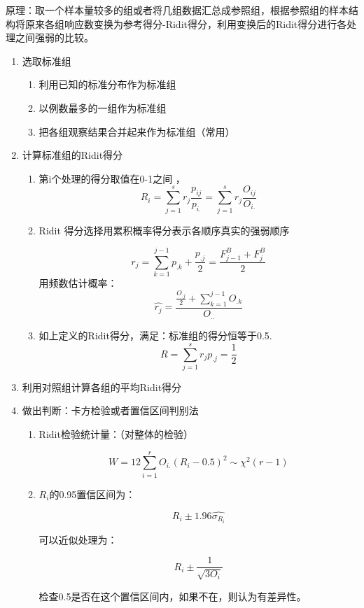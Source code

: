 \documentclass[
]{book}
\providecommand{\tightlist}{%
  \setlength{\itemsep}{0pt}\setlength{\parskip}{0pt}}
\begin{document}
原理：取一个样本量较多的组或者将几组数据汇总成参照组，根据参照组的样本结构将原来各组响应数变换为参考得分-Ridit得分，利用变换后的Ridit得分进行各处理之间强弱的比较。

\begin{enumerate}
\def\labelenumi{\arabic{enumi}.}
\tightlist
\item
  选取标准组

  \begin{enumerate}
  \def\labelenumii{\arabic{enumii}.}
  \tightlist
  \item
    利用已知的标准分布作为标准组
  \item
    以例数最多的一组作为标准组
  \item
    把各组观察结果合并起来作为标准组（常用）
  \end{enumerate}
\item
  计算标准组的Ridit得分

  \begin{enumerate}
  \def\labelenumii{\arabic{enumii}.}
  \item
    第i个处理的得分取值在0-1之间 ， \[
    R_i=\sum_{j=1}^sr_j\frac{p_{ij}}{p_{i.}}=\sum_{j=1}^sr_j\frac{O_{ij}}{O_{i.}}
    \]
  \item
    Ridit 得分选择用累积概率得分表示各顺序真实的强弱顺序

    \[
    r_j = \sum_{k=1}^{j-1}p_{.k}+\frac{p_{.j}}{2}=\frac{F_{j-1}^B+F_{j}^B}{2}
    \] 用频数估计概率： \[
    \hat{r_j}=\frac{\frac{O_{.j}}{2}+\sum_{k=1}^{j-1}O_{.k}}{O_{..}}
    \]
  \item
    如上定义的Ridit得分，满足：标准组的得分恒等于0.5. \[
    R=\sum_{j=1}^sr_jp_{.j}=\frac{1}{2}
    \]
  \end{enumerate}
\item
  利用对照组计算各组的平均Ridit得分
\item
  做出判断：卡方检验或者置信区间判别法

  \begin{enumerate}
  \def\labelenumii{\arabic{enumii}.}
  \item
    Ridit检验统计量：（对整体的检验）

    \[
    W = 12\sum_{i=1}^rO_{i.}(R_i-0.5)^2 \sim \chi^2(r-1)
    \]
  \item
    \(R_i\)的0.95置信区间为：

    \[
    R_i\pm1.96\hat{\sigma_{R_i}}
    \]

    可以近似处理为：

    \[
    R_i \pm \frac{1}{\sqrt{3O_i}}
    \]

    检查0.5是否在这个置信区间内，如果不在，则认为有差异性。
  \end{enumerate}
\end{enumerate}
\end{document}
